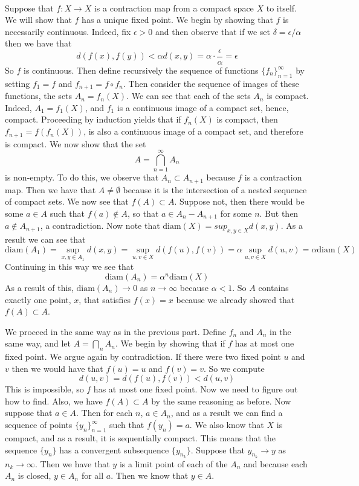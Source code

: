 \documentclass{article}
\newcommand{\problem}[1]{\noindent{\textbf{Problem #1}}\\}
\newcommand{\problempart}[1]{\noindent{\textbf{(#1)}}}
\newcommand{\diam}[1]{\text{diam}(#1)}
\begin{document}
\problem{3.28.7}
\problempart{a} Suppose that $f: X \to X$ is a contraction map from a compact space $X$ to itself. We will show that $f$ has a unique fixed point. We begin by showing that $f$ is necessarily continuous. Indeed, fix $\epsilon > 0$ and then observe that if we set $\delta = \epsilon/\alpha$ then we have that
\[
d(f(x), f(y)) < \alpha d(x,y) = \alpha \cdot \frac{\epsilon}{\alpha} = \epsilon
\] 
So $f$ is continuous. Then define recursively the sequence of functions $\{f_n\}_{n=1}^\infty$ by setting $f_1 = f$ and $f_{n+1} = f\circ f_n$. Then consider the sequence of images of these functions, the sets $A_n = f_n(X)$. We can see that each of the sets $A_n$ is compact. Indeed, $A_1 = f_1(X)$, and $f_1$ is a continuous image of a compact set, hence, compact. Proceeding by induction yields that if $f_n(X)$ is compact, then $f_{n+1} = f(f_n(X))$, is also a continuous image of a compact set, and therefore is compact. We now show that the set
\[
A = \bigcap_{n=1}^\infty A_n
\]
is non-empty. To do this, we observe that $A_n \subset A_{n+1}$ because $f$ is a contraction map. Then we have that $A \neq \emptyset$ because it is the intersection of a nested sequence of compact sets. We now see that $f(A) \subset A$. Suppose not, then there would be some $a \in A$ such that $f(a) \not\in A$, so that $a \in A_n - A_{n+1}$ for some $n$. But then $a \not\in A_{n+1}$, a contradiction. Now note that $\diam{X} = sup_{x,y \in X} d(x,y)$. As a result we can see that
\[
\diam{A_1} = \sup_{x,y \in A_1} d(x,y) = \sup_{u,v \in X} d(f(u), f(v)) = \alpha \sup_{u,v \in X} d(u,v) = \alpha\diam{X}
\]  
Continuing in this way we see that
\[
\diam{A_n} = \alpha^n\diam{X}
\]
As a result of this, $\diam{A_n} \to 0$ as $n \to \infty$ because $\alpha < 1$. So $A$ contains exactly one point, $x$, that satisfies $f(x) = x$ because we already showed that $f(A) \subset A$. 

\problempart{b} We proceed in the same way as in the previous part. Define $f_n$ and $A_n$ in the same way, and let $A = \bigcap_{n} A_n$. We begin by showing that if $f$ has at most one fixed point. We argue again by contradiction. If there were two fixed point $u$ and $v$ then we would have that $f(u) = u$ and $f(v) = v$. So we compute
\[
d(u,v) = d(f(u), f(v)) < d(u,v)
\]
This is impossible, so $f$ has at most one fixed point. Now we need to figure out how to find. Also, we have $f(A) \subset A$ by the same reasoning as before. Now suppose that $a \in A$. Then for each $n$, $a \in A_n$, and as a result we can find a sequence of points $\{y_n\}_{n=1}^{\infty}$ such that $f(y_{n}) = a$. We also know that $X$ is compact, and as a result, it is sequentially compact. This means that the sequence $\{y_n\}$ has a convergent subsequence $\{y_{n_k}\}$. Suppose that $y_{n_k} \to y$ as $n_k \to \infty$. Then we have that $y$ is a limit point of each of the $A_n$ and because each $A_n$ is closed, $y \in A_n$ for all $a$. Then we know that $y \in A$. 
\end{document}
